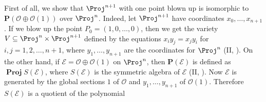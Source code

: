 {First of all, we show that $\Proj^{n+1}$ with one point blown up is isomorphic to $\mathbf P(\mathcal O\oplus\mathcal O(1))$ over $\Proj^n$. Indeed, let $\Proj^{n+1}$ have coordinates $x_0,\ldots,x_{n+1}$. If we blow up the point $P_0=(1,0,\ldots,0)$, then we get the variety $V\subseteq\Proj^n\times\Proj^{n+1}$ defined by the equations $x_i y_j=x_j y_i$ for $i,j=1,2,\ldots,n+1$, where $y_1,\ldots,y_{n+1}$ are the coordinates for $\Proj^n$ (II, ). On the other hand, if $\mathcal E=\mathcal O\oplus\mathcal O(1)$ on $\Proj^n$, then $\mathbf P(\mathcal E)$ is defined as $\operatorname{\mathbf{Proj}}S(\mathcal E)$, where $S(\mathcal E)$ is the symmetric algebra of $\mathcal E$ (II, ). Now $\mathcal E$ is generated by the global sections $1$ of $\mathcal O$ and $y_1,\ldots,y_{n+1}$ of $\mathcal O(1)$. Therefore $S(\mathcal E)$ is a quotient of the polynomial
}
